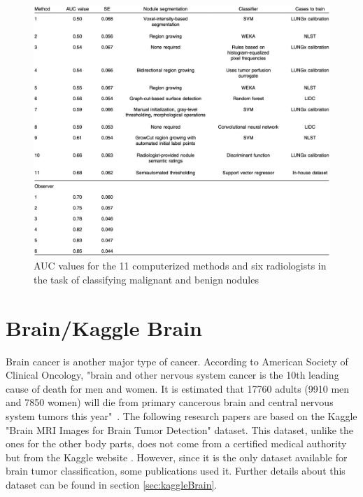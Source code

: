 \begin{figure}[!h]
\centering
\includegraphics[width=1\textwidth, keepaspectratio=true]{./figures/LUNGx_challenge_all_results.png}
\caption{AUC values for the 11 computerized methods and six radiologists in the task of classifying malignant and benign nodules~\cite{12}}
\label{fig:LUNGx_challenge_all_results}
\end{figure}



\section{Brain/Kaggle Brain}
Brain cancer is another major type of cancer. According to American Society of Clinical Oncology, "brain and other nervous system cancer is the 10th leading cause of death for men and women. It is estimated that 17760 adults (9910 men and 7850 women) will die from primary cancerous brain and central nervous system tumors this year"~\cite{43}. The following research papers are based on the Kaggle "Brain MRI Images for Brain Tumor Detection" dataset. This dataset, unlike the ones for the other body parts, does not come from a certified medical authority but from the Kaggle website \cite{45}. However, since it is the only dataset available for brain tumor classification, some publications used it. Further details about this dataset can be found in section \ref{sec:kaggleBrain}.

